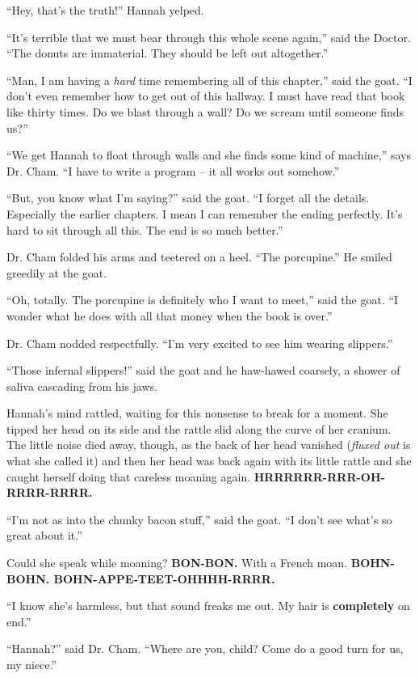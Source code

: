 \documentclass[12pt,twoside]{report}
\begin{document}
``Hey, that's the truth!'' Hannah yelped.

``It's terrible that we must bear through this whole scene again,''
said the Doctor.  ``The donuts are immaterial.  They should be left
out altogether.''

``Man, I am having a {\em hard} time remembering all of this
chapter,'' said the goat.  ``I don't even remember how to get out of
this hallway.  I must have read that book like thirty times.  Do we
blast through a wall?  Do we scream until someone finds us?''

``We get Hannah to float through walls and she finds some kind of
machine,'' says Dr. Cham.  ``I have to write a program -- it all works
out somehow.''

``But, you know what I'm saying?'' said the goat.  ``I forget all the
details. Especially the earlier chapters.  I mean I can remember the
ending perfectly. It's hard to sit through all this.  The end is so
much better.''

Dr. Cham folded his arms and teetered on a heel.  ``The porcupine.''
He smiled greedily at the goat.

``Oh, totally.  The porcupine is definitely who I want to meet,'' said
the goat.  ``I wonder what he does with all that money when the book
is over.''

Dr. Cham nodded respectfully.  ``I'm very excited to see him wearing
slippers.''

``Those infernal slippers!'' said the goat and he haw-hawed coarsely,
a shower of saliva cascading from his jaws.

Hannah's mind rattled, waiting for this nonsense to break for a
moment. She tipped her head on its side and the rattle slid along the
curve of her cranium.  The little noise died away, though, as the back
of her head vanished ({\em fluxed out} is what she called it) and then
her head was back again with its little rattle and she caught herself
doing that careless moaning again.  {\bf HRRRRRR-RRR-OH-RRRR-RRRR.}

``I'm not as into the chunky bacon stuff,'' said the goat.  ``I don't
see what's so great about it.''

Could she speak while moaning? {\bf BON-BON.}  With a French moan.
{\bf BOHN-BOHN. BOHN-APPE-TEET-OHHHH-RRRR.}

``I know she's harmless, but that sound freaks me out.  My hair is
{\bf completely} on end.''

``Hannah?'' said Dr. Cham.  ``Where are you, child?  Come do a good
turn for us, my niece.''
\end{document}
